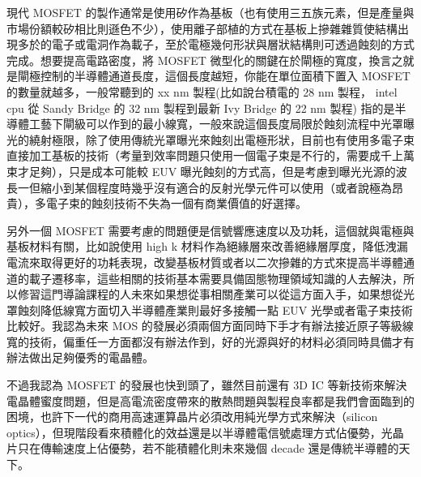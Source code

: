 \documentclass[a4paper,12pt]{article}
\begin{document}
現代 MOSFET 的製作通常是使用矽作為基板（也有使用三五族元素，但是產量與市場份額較矽相比則遜色不少），使用離子部植的方式在基板上摻雜雜質使結構出現多於的電子或電洞作為載子，至於電極幾何形狀與層狀結構則可透過蝕刻的方式完成。想要提高電路密度，將 MOSFET 微型化的關鍵在於閘極的寬度，換言之就是閘極控制的半導體通道長度，這個長度越短，你能在單位面積下置入 MOSFET 的數量就越多，一般常聽到的 xx nm 製程(比如說台積電的 28 nm 製程， intel cpu 從 Sandy Bridge 的 32 nm 製程到最新 Ivy Bridge 的 22 nm 製程) 指的是半導體工藝下閘級可以作到的最小線寬，一般來說這個長度局限於蝕刻流程中光罩曝光的繞射極限，除了使用傳統光罩曝光來蝕刻出電極形狀，目前也有使用多電子束直接加工基板的技術（考量到效率問題只使用一個電子束是不行的，需要成千上萬束才足夠），只是成本可能較 EUV 曝光蝕刻的方式高，但是考慮到曝光光源的波長一但縮小到某個程度時幾乎沒有適合的反射光學元件可以使用（或者說極為昂貴），多電子束的蝕刻技術不失為一個有商業價值的好選擇。

另外一個 MOSFET 需要考慮的問題便是信號響應速度以及功耗，這個就與電極與基板材料有關，比如說使用 high k 材料作為絕緣層來改善絕緣層厚度，降低洩漏電流來取得更好的功耗表現，改變基板材質或者以二次摻雜的方式來提高半導體通道的載子遷移率，這些相關的技術基本需要具備固態物理領域知識的人去解決，所以修習這門導論課程的人未來如果想從事相關產業可以從這方面入手，如果想從光罩蝕刻降低線寬方面切入半導體產業則最好多接觸一點 EUV 光學或者電子束技術比較好。我認為未來 MOS 的發展必須兩個方面同時下手才有辦法接近原子等級線寬的技術，偏重任一方面都沒有辦法作到，好的光源與好的材料必須同時具備才有辦法做出足夠優秀的電晶體。

不過我認為 MOSFET 的發展也快到頭了，雖然目前還有 3D IC 等新技術來解決電晶體蜜度問題，但是高電流密度帶來的散熱問題與製程良率都是我們會面臨到的困境，也許下一代的商用高速運算晶片必須改用純光學方式來解決（silicon optics），但現階段看來積體化的效益還是以半導體電信號處理方式佔優勢，光晶片只在傳輸速度上佔優勢，若不能積體化則未來幾個 decade 還是傳統半導體的天下。
\end{document}
